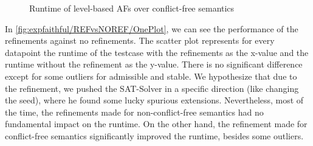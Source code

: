 \begin{figure}[H]
    \centering
    \caption{Runtime of level-based AFs over conflict-free semantics}
    \label{fig:expfaithful/REFvsNOREF/level-based}
\end{figure}

In \cref{fig:expfaithful/REFvsNOREF/OnePlot}, we can see the performance of the refinements against no refinements. The scatter plot represents for every datapoint the runtime of the testcase with the refinements as the x-value and the runtime without the refinement as the y-value. There is no significant difference except for some outliers for admissible and stable. We hypothesize that due to the refinement, we pushed the SAT-Solver in a specific direction (like changing the seed), where he found some lucky spurious extensions. Nevertheless, most of the time, the refinements made for non-conflict-free semantics had no fundamental impact on the runtime. On the other hand, the refinement made for conflict-free semantics significantly improved the runtime, besides some outliers.


